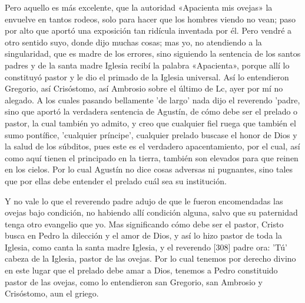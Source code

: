 Pero aquello es más excelente, que la autoridad «Apacienta mis ovejas» la envuelve en tantos rodeos, solo para hacer que los hombres viendo no vean; paso por alto que aportó una exposición tan ridícula inventada por él. Pero vendré a otro sentido suyo, donde dijo muchas cosas; mas yo, no atendiendo a la singularidad, que es madre de los errores, sino siguiendo la sentencia de los santos padres y de la santa madre Iglesia recibí la palabra «Apacienta», porque allí lo constituyó pastor y le dio el primado de la Iglesia universal. Así lo entendieron Gregorio, así Crisóstomo, así Ambrosio sobre el último de Lc, ayer por mí no alegado. A los cuales pasando bellamente 'de largo' nada dijo el reverendo 'padre, sino que aportó la verdadera sentencia de Agustín, de cómo debe ser el prelado o pastor, la cual también yo admito, y creo que cualquier fiel ruega que también el sumo pontífice, 'cualquier príncipe', cualquier prelado buscase el honor de Dios y la salud de los súbditos, pues este es el verdadero apacentamiento, por el cual, así como aquí tienen el principado en la tierra, también son elevados para que reinen en los cielos. Por lo cual Agustín no dice cosas adversas ni pugnan­tes, sino tales que por ellas debe entender el prelado cuál sea su institución.

Y no vale lo que el reverendo padre adujo de que le fueron encomendadas las ovejas bajo condición, no habiendo allí condición alguna, salvo que su paternidad tenga otro evangelio que yo. Mas significando cómo debe ser el pastor, Cristo busca en Pedro la dilección y el amor de Dios, y así lo hizo pastor de toda la Iglesia, como canta la santa madre Iglesia, y el reverendo [308] padre ora: 'Tú' cabeza de la Iglesia, pastor de las ovejas. Por lo cual tenemos por derecho divino en este lugar que el prelado debe amar a Dios, tenemos a Pedro constituido pastor de las ovejas, como lo entendieron san Gregorio, san Ambrosio y Crisóstomo, aun el griego.

